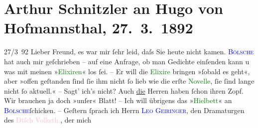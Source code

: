 

               \section[Arthur Schnitzler an Hugo von Hofmannsthal, 27. 3. 1892]{ Arthur Schnitzler an Hugo von Hofmannsthal, 27. 3. 1892}\nopagebreak{}\rehead{ }\normalsize\beginnumbering{} \toendnotes[C]{\smallbreak\pagebreak[2]} 
\toendnotes[C]{\smallbreak}\pstart
           \raggedleft{}{\pb}27/3 92\pend
           \pstart{}Lieber Freund,\pend\pstart
           es war mir ſehr leid, daſs Sie heute nicht kamen. \textcolor{blue}{\textsc{Bölsche}}{}\ledrightnote{\textcolor{blue}{Wilhelm Bölsche}} hat auch mir geſchrieben – auf eine Anfrage, ob man Gedichte einſenden kann u
               was mit meinen »\textcolor{green}{Elixiren}{}\ledrightnote{\textcolor{green}{Die drei Elixire}}« los ſei. – Er will die
                  \textcolor{green}{Elixire}{}\ledrightnote{\textcolor{green}{Die drei Elixire}} bringen »ſobald es geht«, aber »offen
               geſtanden ſind ſie ihm nicht ſo lieb {\pb}wie die erſte \textcolor{green}{Novelle}{}, ſie ſind lange nicht ſo
               aktuell.« – Sagt’ ich’s nicht? Auch \uline{die} Herren haben
               ſchon ihren Zopf. Wir brauchen ja doch »unſer« Blatt! – Ich will übrigens das »\textcolor{green}{Hi{\geminationm}elbett}{}\ledrightnote{\textcolor{green}{Das Himmelbett}}« an \textcolor{blue}{\textsc{Bölsche}}{}\ledrightnote{\textcolor{blue}{Wilhelm Bölsche}}{ }ſchicken. – Geſtern ſprach ich Herrn \textcolor{blue}{\textsc{Leo Geiringer}}{}\ledrightnote{\textcolor{blue}{Leopold Geiringer}}, den Dramaturgen des \textcolor{pink}{Dtſch Volksth.}{}\ledrightnote{\textcolor{pink}{Volkstheater}}, der mich
